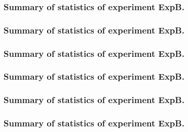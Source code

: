 \documentclass[18pt,c]{beamer}
\begin{document}
 \begin{frame}
 \fontsize{8pt}{9pt}\selectfont
 \frametitle{ Summary of statistics of experiment ExpB. }

 \label{ExpBStatsTable001.tex}  
 \end{frame}

 \begin{frame}
 \fontsize{8pt}{9pt}\selectfont
 \frametitle{ Summary of statistics of experiment ExpB. }

 \label{ExpBStatsTable002.tex}  
 \end{frame}

 \begin{frame}
 \fontsize{8pt}{9pt}\selectfont
 \frametitle{ Summary of statistics of experiment ExpB. }

 \label{ExpBStatsTable003.tex}  
 \end{frame}

 \begin{frame}
 \fontsize{8pt}{9pt}\selectfont
 \frametitle{ Summary of statistics of experiment ExpB. }

 \label{ExpBStatsTable004.tex}  
 \end{frame}

 \begin{frame}
 \fontsize{8pt}{9pt}\selectfont
 \frametitle{ Summary of statistics of experiment ExpB. }

 \label{ExpBStatsTable005.tex}  
 \end{frame}

 \begin{frame}
 \fontsize{8pt}{9pt}\selectfont
 \frametitle{ Summary of statistics of experiment ExpB. }

 \label{ExpBStatsTable006.tex}  
 \end{frame}
\end{document}
